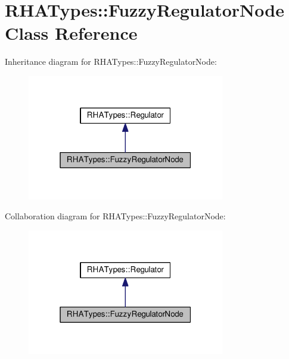 \hypertarget{classRHATypes_1_1FuzzyRegulatorNode}{}\section{R\+H\+A\+Types\+:\+:Fuzzy\+Regulator\+Node Class Reference}
\label{classRHATypes_1_1FuzzyRegulatorNode}


Inheritance diagram for R\+H\+A\+Types\+:\+:Fuzzy\+Regulator\+Node\+:
\nopagebreak
\begin{figure}[H]
\begin{center}
\leavevmode
\includegraphics[width=244pt]{classRHATypes_1_1FuzzyRegulatorNode__inherit__graph}
\end{center}
\end{figure}


Collaboration diagram for R\+H\+A\+Types\+:\+:Fuzzy\+Regulator\+Node\+:
\nopagebreak
\begin{figure}[H]
\begin{center}
\leavevmode
\includegraphics[width=244pt]{classRHATypes_1_1FuzzyRegulatorNode__coll__graph}
\end{center}
\end{figure}
